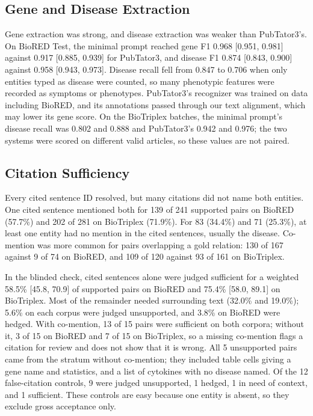 \documentclass[preprint,10pt,letterpaper]{elsarticle}
\begin{document}
\subsection{Gene and Disease Extraction}
Gene extraction was strong, and disease extraction was weaker than PubTator3's. On BioRED Test, the minimal prompt reached gene F1 0.968 [0.951, 0.981] against 0.917 [0.885, 0.939] for PubTator3, and disease F1 0.874 [0.843, 0.900] against 0.958 [0.943, 0.973]. Disease recall fell from 0.847 to 0.706 when only entities typed as disease were counted, so many phenotypic features were recorded as symptoms or phenotypes. PubTator3's recognizer was trained on data including BioRED, and its annotations passed through our text alignment, which may lower its gene score. On the BioTriplex batches, the minimal prompt's disease recall was 0.802 and 0.888 and PubTator3's 0.942 and 0.976; the two systems were scored on different valid articles, so these values are not paired.

\subsection{Citation Sufficiency}
Every cited sentence ID resolved, but many citations did not name both entities. One cited sentence mentioned both for 139 of 241 supported pairs on BioRED (57.7\%) and 202 of 281 on BioTriplex (71.9\%). For 83 (34.4\%) and 71 (25.3\%), at least one entity had no mention in the cited sentences, usually the disease. Co-mention was more common for pairs overlapping a gold relation: 130 of 167 against 9 of 74 on BioRED, and 109 of 120 against 93 of 161 on BioTriplex.

In the blinded check, cited sentences alone were judged sufficient for a weighted 58.5\% [45.8, 70.9] of supported pairs on BioRED and 75.4\% [58.0, 89.1] on BioTriplex. Most of the remainder needed surrounding text (32.0\% and 19.0\%); 5.6\% on each corpus were judged unsupported, and 3.8\% on BioRED were hedged. With co-mention, 13 of 15 pairs were sufficient on both corpora; without it, 3 of 15 on BioRED and 7 of 15 on BioTriplex, so a missing co-mention flags a citation for review and does not show that it is wrong. All 5 unsupported pairs came from the stratum without co-mention; they included table cells giving a gene name and statistics, and a list of cytokines with no disease named. Of the 12 false-citation controls, 9 were judged unsupported, 1 hedged, 1 in need of context, and 1 sufficient. These controls are easy because one entity is absent, so they exclude gross acceptance only.
\end{document}

